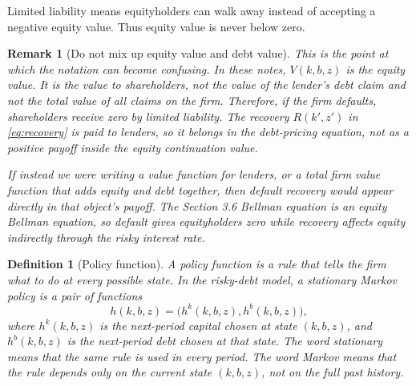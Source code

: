 \documentclass[11pt]{article}
\newtheorem{definition}{Definition}
\newtheorem{remark}{Remark}
\newcommand{\1}{\mathbf{1}}
\begin{document}
Limited liability means equityholders can walk away instead of accepting a
negative equity value. Thus equity value is never below zero.

\begin{remark}[Do not mix up equity value and debt value]
\label{rem:equity-debt-total-value}
This is the point at which the notation can become confusing. In these notes,
\(V(k,b,z)\) is the \emph{equity} value. It is the value to shareholders, not the
value of the lender's debt claim and not the total value of all claims on the
firm. Therefore, if the firm defaults, shareholders receive zero by limited
liability. The recovery \(R(k',z')\) in \cref{eq:recovery} is paid to lenders, so it
belongs in the debt-pricing equation, not as a positive payoff inside the equity
continuation value.

If instead we were writing a value function for lenders, or a total firm value
function that adds equity and debt together, then default recovery would appear
directly in that object's payoff. The Section 3.6 Bellman equation is an equity
Bellman equation, so default gives equityholders zero while recovery affects
equity indirectly through the risky interest rate.
\end{remark}

\begin{definition}[Policy function]
\label{def:policy-function}
A \emph{policy function} is a rule that tells the firm what to do at every
possible state. In the risky-debt model, a stationary Markov policy is a pair of
functions
\[
  h(k,b,z)=\bigl(h^k(k,b,z),h^b(k,b,z)\bigr),
\]
where \(h^k(k,b,z)\) is the next-period capital chosen at state \((k,b,z)\), and
\(h^b(k,b,z)\) is the next-period debt chosen at that state. The word
\emph{stationary} means that the same rule is used in every period. The word
\emph{Markov} means that the rule depends only on the current state
\((k,b,z)\), not on the full past history.
\end{definition}
\end{document}
